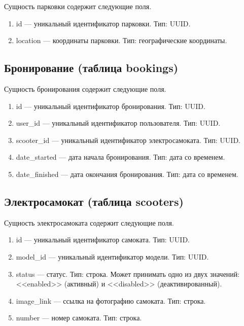 Сущность парковки содержит следующие поля.

\begin{enumerate}
    \item id --- уникальный идентификатор парковки. Тип: UUID.
    \item location --- координаты парковки. Тип: географические координаты.
\end{enumerate}

\subsection{Бронирование (таблица bookings)}

Сущность бронирования содержит следующие поля.

\begin{enumerate}
    \item id --- уникальный идентификатор бронирования. Тип: UUID.
    \item user\_id --- уникальный идентификатор пользователя. Тип: UUID.
    \item scooter\_id --- уникальный идентификатор электросамоката. Тип: UUID.
    \item date\_started --- дата начала бронирования. Тип: дата со временем.
    \item date\_finished --- дата окончания бронирования. Тип: дата со временем.
\end{enumerate}

\subsection{Электросамокат (таблица scooters)}

Сущность электросамоката содержит следующие поля.

\begin{enumerate}
    \item id --- уникальный идентификатор самоката. Тип: UUID.
    \item model\_id --- уникальный идентификатор модели. Тип: UUID.
    \item status --- статус. Тип: строка. Может принимать одно из двух значений: <<enabled>> (активный) и <<disabled>> (деактивированный).
    \item image\_link --- ссылка на фотографию самоката. Тип: строка.
    \item number --- номер самоката. Тип: строка.
\end{enumerate}

